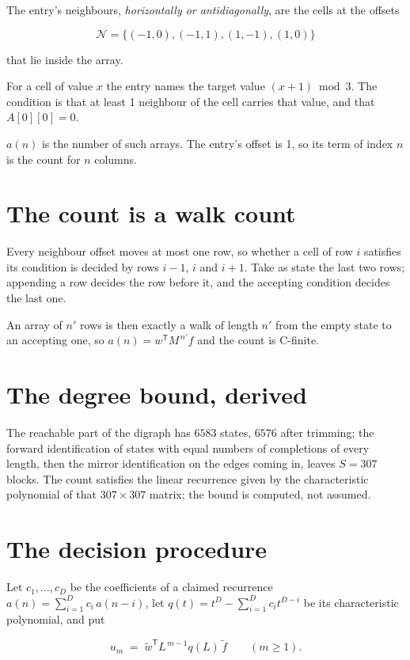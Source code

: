 \documentclass[11pt]{article}
\theoremstyle{definition}
\begin{document}
The entry's neighbours, {\itshape horizontally or antidiagonally}, are the cells at the offsets

\[\mathcal{N} = \{(-1,0), (-1,1), (1,-1), (1,0)\}\]

that lie inside the array.

For a cell of value $x$ the entry names the target value $(x + 1) \bmod 3$. The condition is that at least 1 neighbour of the cell carries that value, and that $A[0][0] = 0$.

$a(n)$ is the number of such arrays. The entry's offset is 1, so its term of index $n$ is the count for $n$ columns.

\section{The count is a walk count}

Every neighbour offset moves at most one row, so whether a cell of row $i$ satisfies its condition is decided by rows $i-1$, $i$ and $i+1$. Take as state the last two rows; appending a row decides the row before it, and the accepting condition decides the last one.

An array of $n'$ rows is then exactly a walk of length $n'$ from the empty state to an accepting one, so $a(n) = w^{\mathsf T}M^{\,n'}f$ and the count is C-finite.

\section{The degree bound, derived}

The reachable part of the digraph has $6583$ states, $6576$ after trimming; the forward identification of states with equal numbers of completions of every length, then the mirror identification on the edges coming in, leaves $S = 307$ blocks. The count satisfies the linear recurrence given by the characteristic polynomial of that $307\times307$ matrix; the bound is computed, not assumed.

\section{The decision procedure}

Let $c_1,\dots,c_D$ be the coefficients of a claimed recurrence $a(n) = \sum_{i=1}^{D} c_i\,a(n-i)$, let $q(t) = t^{D} - \sum_{i=1}^{D} c_i t^{D-i}$ be its characteristic polynomial, and put

\[u_m \;=\; \tilde w^{\mathsf T} L^{\,m-1} q(L)\,\tilde f \qquad (m \ge 1).\]
\end{document}
